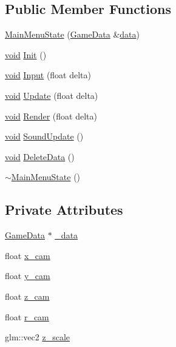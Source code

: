 \subsection*{Public Member Functions}
\begin{DoxyCompactItemize}
\item 
\hyperlink{classMainMenuState_a79e2679fda51c82d1a793cfc15ca9488}{Main\+Menu\+State} (\hyperlink{structGameData}{Game\+Data} \&\hyperlink{imgui__impl__opengl3__loader_8h_abd87654504355b4c1bb002dcb1d4d16a}{data})
\item 
\hyperlink{imgui__impl__opengl3__loader_8h_ac668e7cffd9e2e9cfee428b9b2f34fa7}{void} \hyperlink{classMainMenuState_afab2a9b829a8ef752fed701d5cd260f8}{Init} ()
\item 
\hyperlink{imgui__impl__opengl3__loader_8h_ac668e7cffd9e2e9cfee428b9b2f34fa7}{void} \hyperlink{classMainMenuState_aa62c91d35b5b4a24c0a13c22020845e8}{Input} (float delta)
\item 
\hyperlink{imgui__impl__opengl3__loader_8h_ac668e7cffd9e2e9cfee428b9b2f34fa7}{void} \hyperlink{classMainMenuState_a1605be0d2e5228643d911c7069db3196}{Update} (float delta)
\item 
\hyperlink{imgui__impl__opengl3__loader_8h_ac668e7cffd9e2e9cfee428b9b2f34fa7}{void} \hyperlink{classMainMenuState_af675ec319923f1cf22446808a7735dea}{Render} (float delta)
\item 
\hyperlink{imgui__impl__opengl3__loader_8h_ac668e7cffd9e2e9cfee428b9b2f34fa7}{void} \hyperlink{classMainMenuState_adde4b3b16d68c2c8b3bd03818cc30abe}{Sound\+Update} ()
\item 
\hyperlink{imgui__impl__opengl3__loader_8h_ac668e7cffd9e2e9cfee428b9b2f34fa7}{void} \hyperlink{classMainMenuState_a52c4dad229a1e9851e8742b81bc30abb}{Delete\+Data} ()
\item 
\hyperlink{classMainMenuState_a8af4d586b93c315a1a15b5fe83ec0760}{$\sim$\+Main\+Menu\+State} ()
\end{DoxyCompactItemize}
\subsection*{Private Attributes}
\begin{DoxyCompactItemize}
\item 
\hyperlink{structGameData}{Game\+Data} $\ast$ \hyperlink{classMainMenuState_ac9a8bee0cca101412d442a82b71fc51a}{\+\_\+data}
\item 
float \hyperlink{classMainMenuState_aad371120cedb057ea491f3ae5f214e9e}{x\+\_\+cam}
\item 
float \hyperlink{classMainMenuState_aeb779356ca0465f4c7909172fa72fbf1}{y\+\_\+cam}
\item 
float \hyperlink{classMainMenuState_a392ab62341c193ac205ebbbd8b92e4c3}{z\+\_\+cam}
\item 
float \hyperlink{classMainMenuState_a7928cfda647280f5be8d2944f62279c4}{r\+\_\+cam}
\item 
glm\+::vec2 \hyperlink{classMainMenuState_a39439fa006bd5af7acc63d0735a031f9}{z\+\_\+scale}
\end{DoxyCompactItemize}


